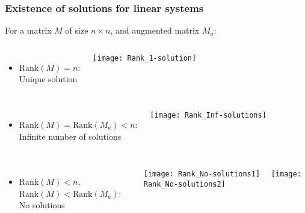 \begin{frame}
 \frametitle{Existence of solutions for linear systems}
  For a matrix $M$ of size $n \times n$, and augmented matrix $M_a$:
 \begin{columns}
 \begin{itemize}
   \item $\text{Rank}(M) = n$:\\ Unique solution
 \end{itemize}
   \texttt{[image: Rank\_1-solution]}
 \end{columns}
 \pause
  \begin{columns}
 \begin{itemize}
   \item $\text{Rank}(M) = \text{Rank}(M_a) < n$:\\ Infinite number of solutions
 \end{itemize}
   \texttt{[image: Rank\_Inf-solutions]}
 \end{columns}
 \pause
  \begin{columns}
 \begin{itemize}
   \item $\text{Rank}(M) < n$, $\text{Rank}(M) < \text{Rank}(M_a)$:\\ No solutions
 \end{itemize}
   \texttt{[image: Rank\_No-solutions1]} \ \ 
   \texttt{[image: Rank\_No-solutions2]}
 \end{columns}
\end{frame}
 
